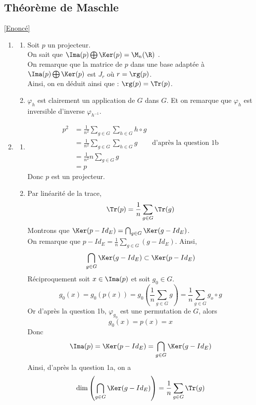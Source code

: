 \documentclass[8pt]{book}
\begin{document}
	\subsection{Théorème de Maschle}
	\label{Théorème de Maschke corrigé}
	\textcolor{blue}{\hyperref[Théorème de Maschke]{[Enoncé]}}\\
	\begin{enumerate}[leftmargin=*]
		\item \begin{enumerate}[label=\alph*.]
			\item Soit $p$ un projecteur.\\
			On sait que $\Ima(p)\bigoplus\Ker(p)=\M_n(\R)$ .\\
			On remarque que la matrice de $p$ dans une base adaptée à $\Ima(p)\bigoplus\Ker(p)$ est $J_r$ où $r=\rg(p)$.\\
			Ainsi, on en déduit ainsi que  : $\rg(p)=\Tr(p)$.
			\item $\varphi_h$ est clairement un application de $G$ dans $G$. Et on remarque que $\varphi_h$ est inversible d'inverse $\varphi_{h^{-1}}$.
		\end{enumerate}
		\item \begin{enumerate}[label=\alph*.]
			\item 
		\begin{align*}
			p^2&=\frac{1}{n^2}\sum_{g\in G}\sum_{h\in G}h\circ g\\
			&=\frac{1}{n^2}\sum_{g\in G}\sum_{h\in G} g &\text{d'après la question 1b}\\
			&=\frac{1}{n^2}n\sum_{g\in G}g\\
			&=p
		\end{align*}
		Donc $p$ est un projecteur.
		\item Par linéarité de la trace, \[\Tr(p)=\frac{1}{n}\sum_{g\in G}\Tr(g)\]
		Montrons que $\Ker(p-Id_E)=\bigcap_{g\in G}\Ker(g-Id_E)$.\\
		On remarque que $\displaystyle p-Id_E=\frac{1}{n}\sum_{g\in G}(g-Id_E)$. Ainsi, \[\bigcap_{g\in G}\Ker(g-Id_E)\subset \Ker(p-Id_E)\]
		Réciproquement soit $x\in \Ima(p)$ et soit $g_0\in G$.
		\[g_0(x)=g_0(p(x))=g_0\left(\frac{1}{n}\sum_{g\in G}g\right)=\frac{1}{n}\sum_{g\in G}g_o\circ g\]
		Or d'après la question 1b, $\varphi_{g_0}$ est une permutation de $G$, alors \[g_0(x)=p(x)=x\]
		Donc \[\Ima(p)=\Ker(p-Id_E)=\bigcap_{g\in G}\Ker(g-Id_E)\]
		Ainsi, d'après la question 1a, on a \[\dim\left(\bigcap_{g\in G}\Ker(g-Id_E)\right)=\frac{1}{n}\sum_{g\in G}\Tr(g)\]
		\end{enumerate}

\end{enumerate}
\end{document}
